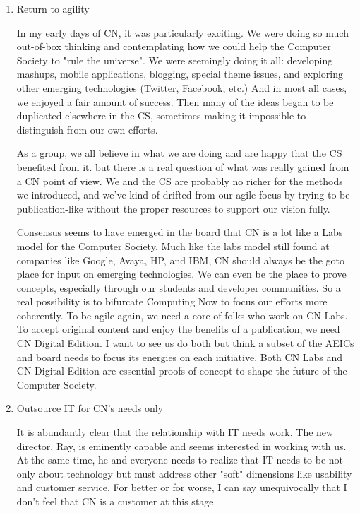 \documentclass[11pt,english]{luclet}
\begin{document}
\begin{enumerate}
\item Return to agility

  In my early days of CN, it was particularly exciting. We were doing so
  much out-of-box thinking and contemplating how we could help the
  Computer Society to "rule the universe". We were seemingly doing it
  all: developing mashups, mobile applications, blogging, special theme
  issues, and exploring other emerging technologies (Twitter, Facebook,
  etc.) And in most all cases, we enjoyed a fair amount of success. Then
  many of the ideas began to be duplicated elsewhere in the CS,
  sometimes making it impossible to distinguish from our own efforts.

  As a group, we all believe in what we are doing and are happy that the
  CS benefited from it. but there is a real question of what was really
  gained from a CN point of view. We and the CS are probably no richer
  for the methods we introduced, and we've kind of drifted from our
  agile focus by trying to be publication-like without the proper
  resources to support our vision fully.

  Consensus seems to have emerged in the board that CN is a lot like a
  Labs model for the Computer Society.  Much like the labs model still
  found at companies like Google, Avaya, HP, and IBM, CN should always
  be the goto place for input on emerging technologies. We can even be
  the place to prove concepts, especially through our students and
  developer communities.  So a real possibility is to bifurcate
  Computing Now to focus our efforts more coherently. To be agile again,
  we need a core of folks who work on CN Labs. To accept original
  content and enjoy the benefits of a publication, we need CN Digital
  Edition. I want to see us do both but think a subset of the AEICs and
  board needs to focus its energies on each initiative. Both CN Labs and
  CN Digital Edition are essential proofs of concept to shape the future
  of the Computer Society.

\item Outsource IT for CN's needs only

  It is abundantly clear that the relationship with IT needs work. The
  new director, Ray, is eminently capable and seems interested in
  working with us. At the same time, he and everyone needs to realize
  that IT needs to be not only about technology but must address other
  "soft" dimensions like usability and customer service. For better or
  for worse, I can say unequivocally that I don't feel that CN is a
  customer at this stage.


\end{enumerate}
\end{document}
